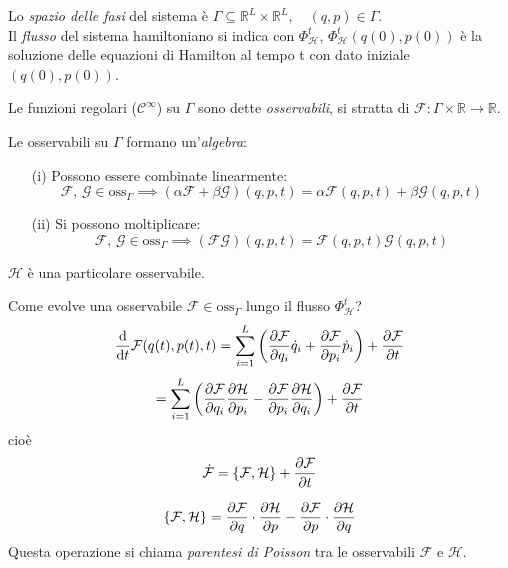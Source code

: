 Lo \textit{spazio delle fasi} del sistema è $\Gamma\subseteq \mathbb{R}^L\times \mathbb{R}^L,\quad (q,p)\in \Gamma$.\\
Il \textit{flusso} del sistema hamiltoniano si indica con $\Phi_\mathcal{H}^t$, $\Phi_\mathcal{H}^t(q(0),p(0))$
è la soluzione delle equazioni di Hamilton al tempo t con dato iniziale $(q(0),p(0))$.

\begin{definition}
    Le funzioni regolari ($\mathcal{C}^\infty$) su $\Gamma$ sono dette \textit{osservabili}, si stratta di $\mathcal{F}: \Gamma\times \mathbb{R}\rightarrow \mathbb{R}$.
\end{definition}

\begin{definition}
    Le osservabili su $\Gamma $ formano un'\textit{algebra}:
    \begin{itemize}
        \item[(i)] Possono essere combinate linearmente:
        \begin{equation}
            \mathcal{F}, \,\mathcal{G} \in \text{oss}_\Gamma\implies (\alpha\mathcal{F}+\beta\mathcal{G})(q,p,t)= 
            \alpha\mathcal{F}(q,p,t)+\beta\mathcal{G}(q,p,t)
        \end{equation}
        \item[(ii)]Si possono moltiplicare:
        \begin{equation}
            \mathcal{F}, \,\mathcal{G} \in \text{oss}_\Gamma\implies \left( \mathcal{F}\mathcal{G} \right)(q,p,t)= \mathcal{F}(q,p,t)\mathcal{G}(q,p,t)
        \end{equation}
    \end{itemize}
\end{definition}   

\begin{remark}
    $\mathcal{H}$ è una particolare osservabile.
\end{remark}

Come evolve una osservabile $\mathcal{F}\in \text{oss}_\Gamma$ lungo il flusso $\Phi_\mathcal{H}^t$?
\begin{equation}
    \dv{t}\mathcal{F}(q(t),p(t),t) 
    = \sum_{i=1}^L \left( \pdv{\mathcal{F}}{q_i}\dot{q}_i+ \pdv{\mathcal{F}}{p_i}\dot{p}_i \right)+ \pdv{\mathcal{F}}{t}
\end{equation}
\begin{equation}
    = \sum_{i=1}^L \left( \pdv{\mathcal{F}}{q_i}\pdv{\mathcal{H}}{p_i}- \pdv{\mathcal{F}}{p_i}\pdv{\mathcal{H}}{q_i}\right)+ \pdv{\mathcal{F}}{t}
\end{equation}
cioè
\begin{equation}
    \dot{\mathcal{F}}= \{\mathcal{F},\mathcal{H}\}+ \pdv{\mathcal{F}}{t}
\end{equation}
\begin{definition}
    \begin{equation}
        \{\mathcal{F},\mathcal{H}\}=
        \pdv{\mathcal{F}}{q}\cdot\pdv{\mathcal{H}}{p}- \pdv{\mathcal{F}}{p}\cdot\pdv{\mathcal{H}}{q}
    \end{equation}
    Questa operazione si chiama \textit{parentesi di Poisson} tra le osservabili $\mathcal{F}$ e $\mathcal{H}$.
\end{definition}

